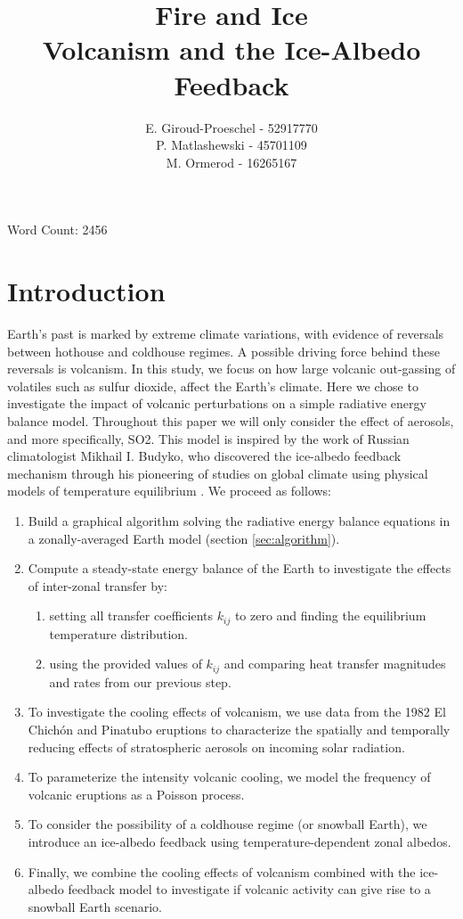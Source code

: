 \documentclass[12pt]{article}
\title{Fire and Ice\\
\large Volcanism and the Ice-Albedo Feedback}
\author{
    E. Giroud-Proeschel - 52917770 \\
    P. Matlashewski - 45701109\\
    M. Ormerod - 16265167
}
\begin{document}
\maketitle
\centering
Word Count: 2456
\newpage
\tableofcontents
\newpage

\section{Introduction}
Earth's past is marked by extreme climate variations, with evidence of
reversals between hothouse and coldhouse regimes. A possible driving force behind
these reversals is volcanism. In this study, we focus on
how large volcanic out-gassing of volatiles such as sulfur dioxide,
affect the Earth's climate. Here we chose to investigate
the impact of volcanic perturbations on a simple radiative
energy balance model. Throughout this paper we will only consider the effect of aerosols,
and more specifically, SO2. This model is inspired by the
work of Russian climatologist Mikhail I. Budyko, who discovered the ice-albedo
feedback mechanism through his pioneering of studies
on global climate using physical models of temperature equilibrium \parencite{budyko_albedo}.
We proceed as follows:

\begin{enumerate}
    \item Build a graphical algorithm solving the radiative energy balance equations
    in a zonally-averaged Earth model (section \ref{sec:algorithm}).
    \item Compute a steady-state energy balance of the Earth to investigate
    the effects of inter-zonal transfer by:
    \begin{enumerate}
        \item setting all transfer coefficients $k_{ij}$ to zero and finding the
        equilibrium temperature distribution.
        \item using the provided values of $k_{ij}$ and comparing heat transfer
        magnitudes and rates from our previous step.
    \end{enumerate}
    \item To investigate the cooling effects of volcanism, we use data from
    the 1982 El Chichón and Pinatubo eruptions \parencite{robock}
    to characterize the spatially and temporally reducing effects of stratospheric aerosols
    on incoming solar radiation.
    \item To parameterize the intensity volcanic cooling, we model the frequency
    of volcanic eruptions as a Poisson process.
    \item To consider the possibility of a coldhouse regime (or snowball Earth),
    we introduce an ice-albedo feedback using temperature-dependent zonal albedos.
    \item Finally, we combine the cooling effects of volcanism combined with the
    ice-albedo feedback model to investigate if volcanic activity
    can give rise to a snowball Earth scenario.


\end{enumerate}
\end{document}

